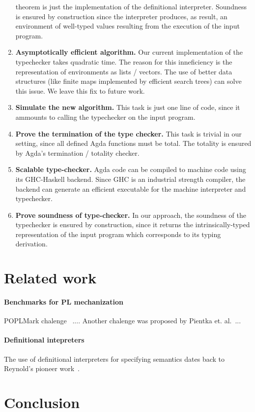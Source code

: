 \documentclass[sigconf]{acmart}
\theoremstyle{definition}
\begin{document}
\begin{enumerate}
        theorem is just the implementation of the definitional interpreter. Soundness is ensured by construction since the interpreter
        produces, as result, an environment of well-typed values resulting from the execution of the input program.
  \item \textbf{Asymptotically efficient algorithm.} Our current implementation of the typechecker takes quadratic time. The reason
        for this inneficiency is the representation of environments as lists / vectors. The use of better data structures (like finite
        maps implemented by efficient search trees) can solve this issue. We leave this fix to future work.
  \item \textbf{Simulate the new algorithm.} This task is just one line of code, since it ammounts to calling the typechecker
        on the input program.
  \item \textbf{Prove the termination of the type checker.} This task is trivial in our setting, since all defined Agda functions
        must be total. The totality is ensured by Agda's termination / totality checker.
  \item \textbf{Scalable type-checker.} Agda code can be compiled to machine code using its GHC-Haskell backend. Since GHC is
        an industrial strength compiler, the backend can generate an efficient executable for the machine interpreter and typechecker. 
  \item \textbf{Prove soundness of type-checker.} In our approach, the soundness of the typechecker is ensured by construction,
        since it returns the intrinsically-typed representation of the input program which corresponds to its typing derivation.
\end{enumerate}


\section{Related work}\label{sec:related}

\paragraph{Benchmarks for PL mechanization}{
POPLMark chalenge~\cite{Aydemir05} .... Another chalenge was proposed by Pientka et. al.~\cite{Pientka18}...
}

\paragraph{Definitional intepreters}{
The use of definitional interpreters for specifying semantics dates back to Reynold's pioneer work~\cite{Reynolds72}.
}

\section{Conclusion}\label{sec:conclusion}





\end{document}
